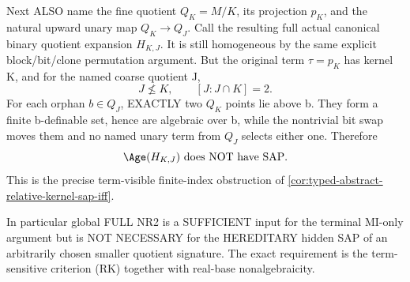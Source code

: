 \begin{example}
Next ALSO name the
fine quotient
$Q_K=M/K$, its
projection $p_K$,
and the natural upward
unary map $Q_K\to Q_J$.
Call the resulting
full actual canonical
binary quotient
expansion $H_{K,J}$.
It is still homogeneous
by the same explicit
block/bit/clone
permutation argument.
But the original term
$\tau=p_K$ has kernel
K, and for the
named coarse quotient
J,
\[
                  J\nleq K,\qquad
                  [J:J\cap K]=2.
\]
For each orphan
$b\in Q_J$, EXACTLY
two $Q_K$ points lie
above b. They form
a finite b-definable
set, hence are
algebraic over b,
while the nontrivial
bit swap moves them
and no named unary
term from $Q_J$
selects either one.
Therefore
\[
                 \Age(H_{K,J})
                       \text{ does NOT have SAP}.
\]
This is the precise
term-visible
finite-index obstruction
of
\cref{cor:typed-abstract-relative-kernel-sap-iff}.

In particular global
FULL NR2 is a
SUFFICIENT input for
the terminal MI-only
argument but is
NOT NECESSARY for the
HEREDITARY hidden SAP
of an arbitrarily
chosen smaller
quotient signature.
The exact requirement
is the term-sensitive
criterion (RK)
together with
real-base
nonalgebraicity.
\end{example}

